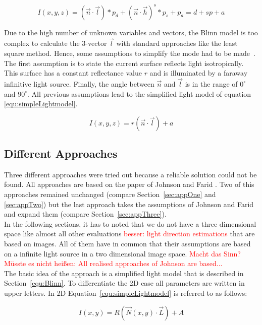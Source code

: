 \begin{equation}
\label{equ:Blinn}
I(x,y,z) = (\vec{n}\cdot \vec{l})*p_d + (\vec{n}\cdot\vec{h})^s*p_s + p_a = d + sp + a
\end{equation} 

Due to the high number of unknown variables and vectors, the Blinn model is too complex to calculate the 3-vector $\vec{l}$ with standard approaches like the least square method. Hence, some assumptions to simplify the mode had to be made~\cite{Johnson}. The first assumption is to state the current surface reflects light isotropically. This surface has a constant reflectance value $r$ and is illuminated by a faraway infinitive light source. Finally, the angle between $\vec{n}$ and  $\vec{l}$ is in the range of $0^\circ $ and $90^\circ$. All previous assumptions lead to the simplified light model of equation \ref{equ:simpleLightmodel}.

\begin{equation}
\label{equ:simpleLightmodel}
I(x,y,z) = r(\vec{n}\cdot \vec{l}) + a
\end{equation} 

\subsection{Different Approaches}\label{sec:approaches}
Three different approaches were tried out because a reliable solution could not be found. All approaches are based on the paper of Johnson and Farid \cite{Johnson}. 
Two of this approaches remained unchanged (compare Section~\ref{sec:appOne} and \ref{sec:appTwo}) but the last approach takes the assumptions of Johnson and Farid and expand them (compare Section~\ref{sec:appThree}). \\
In the following sections, it has to noted that we do not have a three dimensional space like almost all other evaluations \textcolor{red}{besser: light direction estimations} that are based on images. All of them have in common that their assumptions are based on a infinite light source in a two dimensional image space. \textcolor{red}{Macht das Sinn? Müsste es nicht heißen: All realised approaches of Johnson are based...}\\
The basic idea of the approach is a simplified light model that is described in Section~\ref{equ:Blinn}. To differentiate the 2D case all parameters are written in upper letters. In 2D Equation~\ref{equ:simpleLightmodel} is referred to as follows:

\begin{equation}
\label{equ:General}
I(x,y) = R(\vec{N}(x,y)\cdot \vec{L}) + A
\end{equation}

